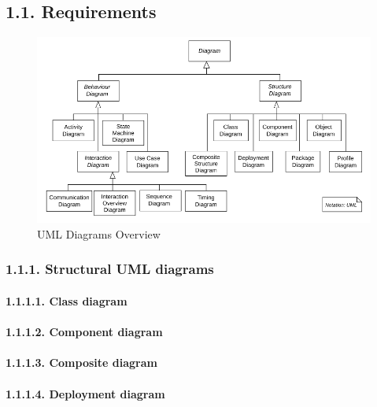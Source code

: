 \documentclass[
]{article}
\begin{document}
\hypertarget{requirements}{%
\subsection{1.1. Requirements}\label{requirements}}

\begin{figure}
\centering
\includegraphics{../requirements/uml_diagrams_overview.png}
\caption{UML Diagrams Overview}
\end{figure}

\hypertarget{structural-uml-diagrams}{%
\subsubsection{1.1.1. Structural UML
diagrams}\label{structural-uml-diagrams}}

\hypertarget{class-diagram}{%
\paragraph{1.1.1.1. Class diagram}\label{class-diagram}}

\hypertarget{component-diagram}{%
\paragraph{1.1.1.2. Component diagram}\label{component-diagram}}

\hypertarget{composite-diagram}{%
\paragraph{1.1.1.3. Composite diagram}\label{composite-diagram}}

\hypertarget{deployment-diagram}{%
\paragraph{1.1.1.4. Deployment diagram}\label{deployment-diagram}}
\end{document}
